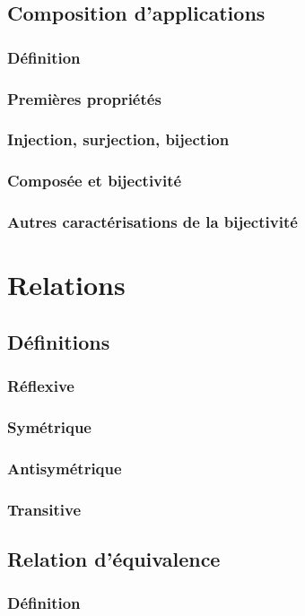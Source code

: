 \documentclass[12pt,a4paper,french]{book}
\begin{document}
		\subsection{Composition d'applications}
			\subsubsection{Définition}
			\subsubsection{Premières propriétés}
			\subsubsection{Injection, surjection, bijection}
			\subsubsection{Composée et bijectivité}
			\subsubsection{Autres caractérisations de la bijectivité}
	\section{Relations}
		\subsection{Définitions}
			\subsubsection{Réflexive}
			\subsubsection{Symétrique}
			\subsubsection{Antisymétrique}
			\subsubsection{Transitive}
		\subsection{Relation d'équivalence}
			\subsubsection{Définition}
\end{document}
